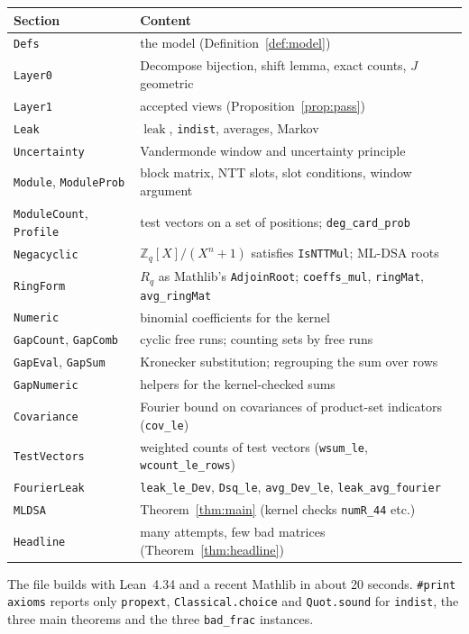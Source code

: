 \documentclass[11pt]{article}
\theoremstyle{definition}
\theoremstyle{remark}
\newcommand{\Zq}{\mathbb{Z}_q}
\newcommand{\Rq}{R_q}
\newcommand{\leak}{\operatorname{leak}}
\newcommand{\lean}[1]{\texttt{#1}}
\begin{document}
\begin{center}
\begin{tabular}{ll}
\toprule
Section & Content \\
\midrule
\lean{Defs} & the model (Definition~\ref{def:model}) \\
\lean{Layer0} & Decompose bijection, shift lemma, exact counts, $J$ geometric \\
\lean{Layer1} & accepted views (Proposition~\ref{prop:pass}) \\
\lean{Leak} & $\leak$, \lean{indist}, averages, Markov \\
\lean{Uncertainty} & Vandermonde window and uncertainty principle \\
\lean{Module}, \lean{ModuleProb} & block matrix, NTT slots, slot conditions, window argument \\
\lean{ModuleCount}, \lean{Profile} & test vectors on a set of positions; \lean{deg\_card\_prob} \\
\lean{Negacyclic} & $\Zq[X]/(X^n+1)$ satisfies \lean{IsNTTMul}; ML-DSA roots \\
\lean{RingForm} & $\Rq$ as Mathlib's \lean{AdjoinRoot}; \lean{coeffs\_mul}, \lean{ringMat}, \lean{avg\_ringMat} \\
\lean{Numeric} & binomial coefficients for the kernel \\
\lean{GapCount}, \lean{GapComb} & cyclic free runs; counting sets by free runs \\
\lean{GapEval}, \lean{GapSum} & Kronecker substitution; regrouping the sum over rows \\
\lean{GapNumeric} & helpers for the kernel-checked sums \\
\lean{Covariance} & Fourier bound on covariances of product-set indicators (\lean{cov\_le}) \\
\lean{TestVectors} & weighted counts of test vectors (\lean{wsum\_le}, \lean{wcount\_le\_rows}) \\
\lean{FourierLeak} & \lean{leak\_le\_Dev}, \lean{Dsq\_le}, \lean{avg\_Dev\_le}, \lean{leak\_avg\_fourier} \\
\lean{MLDSA} & Theorem~\ref{thm:main} (kernel checks \lean{numR\_44} etc.) \\
\lean{Headline} & many attempts, few bad matrices (Theorem~\ref{thm:headline}) \\
\bottomrule
\end{tabular}
\end{center}

The file builds with Lean~4.34 and a recent Mathlib in about 20 seconds.
\lean{\#print axioms} reports only \lean{propext}, \lean{Classical.choice} and \lean{Quot.sound}
for \lean{indist}, the three main theorems and the three \lean{bad\_frac} instances.
\end{document}
